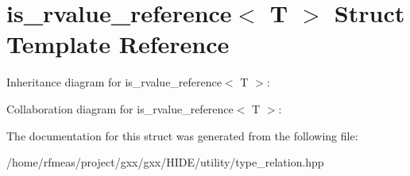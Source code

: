 \hypertarget{structis__rvalue__reference}{}\section{is\+\_\+rvalue\+\_\+reference$<$ T $>$ Struct Template Reference}
\label{structis__rvalue__reference}


Inheritance diagram for is\+\_\+rvalue\+\_\+reference$<$ T $>$\+:


Collaboration diagram for is\+\_\+rvalue\+\_\+reference$<$ T $>$\+:


The documentation for this struct was generated from the following file\+:\begin{DoxyCompactItemize}
\item 
/home/rfmeas/project/gxx/gxx/\+H\+I\+D\+E/utility/type\+\_\+relation.\+hpp\end{DoxyCompactItemize}
